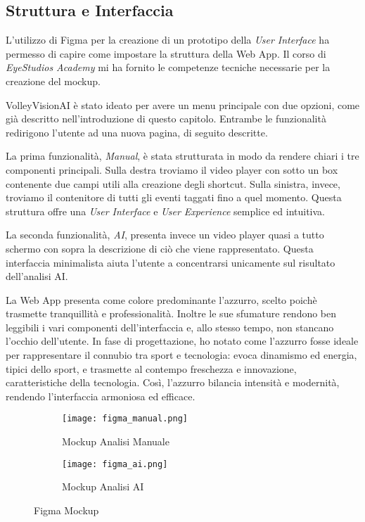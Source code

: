 \subsection{Struttura e Interfaccia}
\label{subsec:interfaccia}

L'utilizzo di Figma per la creazione di un prototipo della \textit{User Interface} ha permesso di capire come impostare la struttura della Web App. Il corso di \textit{EyeStudios Academy} mi ha fornito le competenze tecniche necessarie per la creazione del mockup.

VolleyVisionAI è stato ideato per avere un menu principale con due opzioni, come già descritto nell'introduzione di questo capitolo. Entrambe le funzionalità redirigono l'utente ad una nuova pagina, di seguito descritte.

La prima funzionalità, \textit{Manual}, è stata strutturata in modo da rendere chiari i tre componenti principali. Sulla destra troviamo il video player con sotto un box contenente due campi utili alla creazione degli shortcut. Sulla sinistra, invece, troviamo il contenitore di tutti gli eventi taggati fino a quel momento. Questa struttura offre una \textit{User Interface} e \textit{User Experience} semplice ed intuitiva. 

La seconda funzionalità, \textit{AI}, presenta invece un video player quasi a tutto schermo con sopra la descrizione di ciò che viene rappresentato. Questa interfaccia minimalista aiuta l'utente a concentrarsi unicamente sul risultato dell'analisi AI. 

La Web App presenta come colore predominante l'azzurro, scelto poichè trasmette tranquillità e professionalità. Inoltre le sue sfumature rendono ben leggibili i vari componenti dell'interfaccia e, allo stesso tempo, non stancano l'occhio dell'utente. In fase di progettazione, ho notato come l'azzurro fosse ideale per rappresentare il connubio tra sport e tecnologia: evoca dinamismo ed energia, tipici dello sport, e trasmette al contempo freschezza e innovazione, caratteristiche della tecnologia. Così, l'azzurro bilancia intensità e modernità, rendendo l'interfaccia armoniosa ed efficace.

\begin{figure}[htb]
    \centering 
    \begin{subfigure}{0.48\textwidth}
        \texttt{[image: figma\_manual.png]}
        \caption{Mockup Analisi Manuale}
        \label{fig:mokup_manual}
    \end{subfigure}\hspace{0.04\textwidth}%
    \begin{subfigure}{0.48\textwidth}
        \texttt{[image: figma\_ai.png]}
        \caption{Mockup Analisi AI}
        \label{fig:mokup_ai}
    \end{subfigure}
    \caption{Figma Mockup}
    \label{fig:bot_competitor}
\end{figure}

